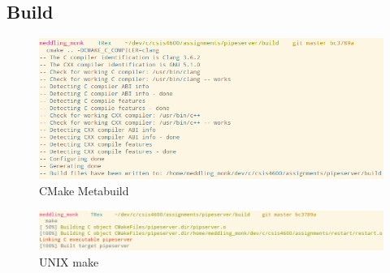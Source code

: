 \documentclass[letter,12pt,sffamily]{article}
\begin{document}
\subsection{Build}
\begin{figure}[H]
	\centering
	\includegraphics[width=1\linewidth]{./images/1}
	\caption[CMake_prep]{CMake Metabuild}
	\label{fig:1}
\end{figure}
\begin{figure}[H]
	\centering
	\includegraphics[width=1\linewidth]{./images/2}
	\caption[make_build]{UNIX make}
	\label{fig:2}
\end{figure}
\end{document}
